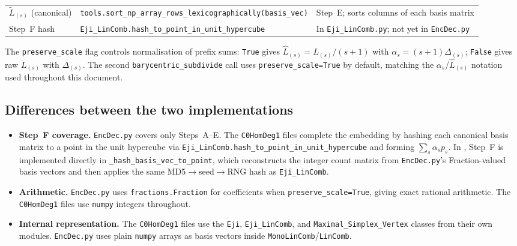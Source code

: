 \documentclass[11pt,a4paper]{article}
\newcommand{\encdecpy}{\texttt{EncDec.py}}
\newcommand{\canon}[1]{\widetilde{#1}}  %
\begin{document}
\begin{center}
\begin{tabular}{p{3.4cm} p{6cm} p{4.8cm}}
$\canon{L}_{(s)}$ (canonical) &
  \texttt{tools.sort\_np\_array\_rows\_}\newline\texttt{lexicographically(basis\_vec)} &
  Step~E; sorts columns of each basis matrix \\[3pt]

Step~F hash &
  \texttt{Eji\_LinComb.}\newline\texttt{hash\_to\_point\_in\_unit\_hypercube} &
  In \texttt{Eji\_LinComb.py}; not yet in \encdecpy \\
\bottomrule
\end{tabular}
\end{center}

\noindent
The \texttt{preserve\_scale} flag controls normalisation of prefix sums:
\texttt{True} gives $\hat{L}_{(s)} = L_{(s)}/(s{+}1)$ with
$\alpha_s = (s{+}1)\Delta_{(s)}$; \texttt{False} gives raw $L_{(s)}$ with
$\Delta_{(s)}$.  The second \texttt{barycentric\_subdivide} call uses
\texttt{preserve\_scale=True} by default, matching the $\alpha_s$/$\hat{L}_{(s)}$
notation used throughout this document.

\subsection*{Differences between the two implementations}

\begin{sloppypar}
\begin{itemize}[nosep]
\item \textbf{Step~F coverage.}  \encdecpy{} covers only Steps~A--E.
  The \texttt{C0HomDeg1} files complete the embedding by hashing each canonical
  basis matrix to a point in the unit hypercube via
  \texttt{Eji\_LinComb.}\allowbreak\texttt{hash\_to\_point\_in\_unit\_hypercube}
  and forming $\sum_s \alpha_s p_s$.  In \algtwobpy{}, Step~F is implemented
  directly in \texttt{\_hash\_basis\_vec\_to\_point}, which reconstructs the
  integer count matrix from \encdecpy{}'s Fraction-valued basis vectors and then
  applies the same MD5$\to$seed$\to$RNG hash as \texttt{Eji\_LinComb}.

\item \textbf{Arithmetic.}  \encdecpy{} uses \texttt{fractions.Fraction} for
  coefficients when \texttt{preserve\_scale=True}, giving exact rational
  arithmetic.  The \texttt{C0HomDeg1} files use \texttt{numpy} integers
  throughout.

\item \textbf{Internal representation.}  The \texttt{C0HomDeg1} files use the
  \texttt{Eji}, \texttt{Eji\_LinComb}, and \texttt{Maximal\_Simplex\_Vertex}
  classes from their own modules.  \encdecpy{} uses plain \texttt{numpy} arrays
  as basis vectors inside \texttt{MonoLinComb}/\texttt{LinComb}.
\end{itemize}
\end{sloppypar}
\end{document}
